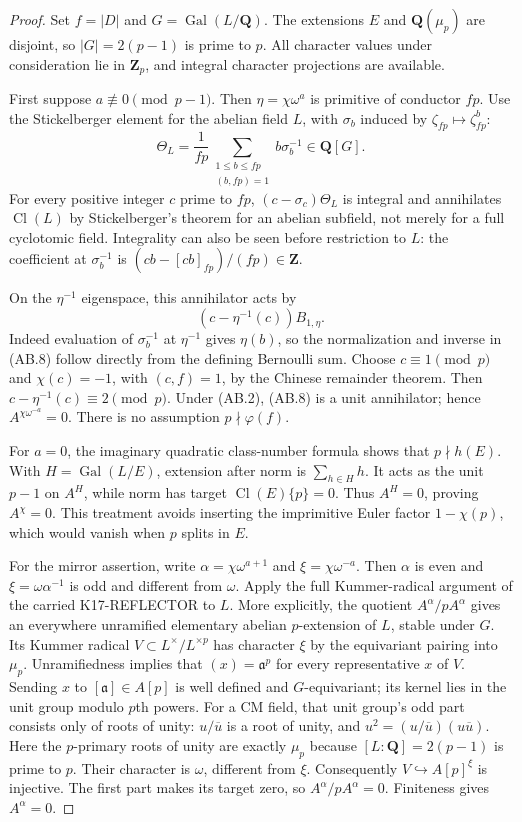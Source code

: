 \begin{proof}
Set $f=|D|$ and $G=\operatorname{Gal}(L/\mathbf Q)$.
The extensions $E$ and $\mathbf Q(\mu_p)$ are disjoint,
so $|G|=2(p-1)$ is prime to $p$.  All character values
under consideration lie in $\mathbf Z_p$, and integral
character projections are available.

First suppose $a\not\equiv0\pmod{p-1}$.  Then
$\eta=\chi\omega^a$ is primitive of conductor $fp$.
Use the Stickelberger element for the abelian field $L$,
with $\sigma_b$ induced by $\zeta_{fp}\mapsto\zeta_{fp}^b$:
\[
 \Theta_L=\frac1{fp}\sum_{\substack{1\le b\le fp\\(b,fp)=1}}
                     b\sigma_b^{-1}\in\mathbf Q[G].       \tag{AB.7}
\]
For every positive integer $c$ prime to $fp$,
$(c-\sigma_c)\Theta_L$ is integral and annihilates
$\operatorname{Cl}(L)$ by Stickelberger's theorem for an
abelian subfield, not merely for a full cyclotomic field.
Integrality can also be seen before restriction to $L$:
the coefficient at $\sigma_b^{-1}$ is
$(cb-[cb]_{fp})/(fp)\in\mathbf Z$.

On the $\eta^{-1}$ eigenspace, this annihilator acts by
\[
                  (c-\eta^{-1}(c))B_{1,\eta}.             \tag{AB.8}
\]
Indeed evaluation of $\sigma_b^{-1}$ at $\eta^{-1}$
gives $\eta(b)$, so the normalization and inverse in
(AB.8) follow directly from the defining Bernoulli sum.
Choose $c\equiv1\pmod p$ and $\chi(c)=-1$, with
$(c,f)=1$, by the Chinese remainder theorem.  Then
$c-\eta^{-1}(c)\equiv2\pmod p$.  Under (AB.2), (AB.8)
is a unit annihilator; hence $A^{\chi\omega^{-a}}=0$.
There is no assumption $p\nmid\varphi(f)$.

For $a=0$, the imaginary quadratic class-number formula
shows that $p\nmid h(E)$.  With
$H=\operatorname{Gal}(L/E)$, extension after norm is
$\sum_{h\in H}h$.  It acts as the unit $p-1$ on $A^H$,
while norm has target $\operatorname{Cl}(E)\{p\}=0$.
Thus $A^H=0$, proving $A^\chi=0$.  This treatment avoids
inserting the imprimitive Euler factor $1-\chi(p)$, which
would vanish when $p$ splits in $E$.

For the mirror assertion, write
$\alpha=\chi\omega^{a+1}$ and $\xi=\chi\omega^{-a}$.
Then $\alpha$ is even and $\xi=\omega\alpha^{-1}$ is
odd and different from $\omega$.  Apply the full
Kummer-radical argument of the carried K17-REFLECTOR to
$L$.  More explicitly, the quotient
$A^\alpha/pA^\alpha$ gives an everywhere unramified
elementary abelian $p$-extension of $L$, stable under $G$.
Its Kummer radical $V\subset L^\times/L^{\times p}$ has
character $\xi$ by the equivariant pairing into $\mu_p$.
Unramifiedness implies that $(x)=\mathfrak a^p$ for every
representative $x$ of $V$.  Sending $x$ to
$[\mathfrak a]\in A[p]$ is well defined and $G$-equivariant;
its kernel lies in the unit group modulo $p$th powers.
For a CM field, that unit group's odd part consists only
of roots of unity: $u/\overline u$ is a root of unity,
and $u^2=(u/\overline u)(u\overline u)$.
Here the $p$-primary roots of unity are exactly $\mu_p$
because $[L:\mathbf Q]=2(p-1)$ is prime to $p$.
Their character is $\omega$, different from $\xi$.
Consequently $V\hookrightarrow A[p]^\xi$ is injective.
The first part makes its target zero, so
$A^\alpha/pA^\alpha=0$.  Finiteness gives $A^\alpha=0$.


\end{proof}
